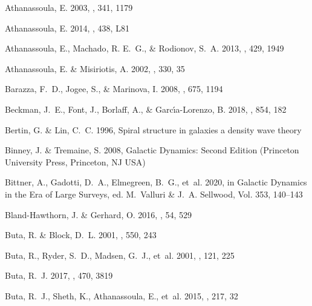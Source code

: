 \documentclass{aa}
\begin{document}
\begin{thebibliography}{100}
{Athanassoula}, E. 2003, \mnras, 341, 1179

{Athanassoula}, E. 2014, \mnras, 438, L81

{Athanassoula}, E., {Machado}, R. E.~G., \& {Rodionov}, S.~A. 2013, \mnras,
  429, 1949

{Athanassoula}, E. \& {Misiriotis}, A. 2002, \mnras, 330, 35

{Barazza}, F.~D., {Jogee}, S., \& {Marinova}, I. 2008, \apj, 675, 1194

{Beckman}, J.~E., {Font}, J., {Borlaff}, A., \& {Garc{\'\i}a-Lorenzo}, B. 2018,
  \apj, 854, 182

{Bertin}, G. \& {Lin}, C.~C. 1996, {Spiral structure in galaxies a density wave
  theory}

{Binney}, J. \& {Tremaine}, S. 2008, {Galactic Dynamics: Second Edition}
  (Princeton University Press, Princeton, NJ USA)

{Bittner}, A., {Gadotti}, D.~A., {Elmegreen}, B.~G., {et~al.} 2020, in Galactic
  Dynamics in the Era of Large Surveys, ed. M.~{Valluri} \& J.~A. {Sellwood},
  Vol. 353, 140--143

{Bland-Hawthorn}, J. \& {Gerhard}, O. 2016, \araa, 54, 529

{Buta}, R. \& {Block}, D.~L. 2001, \apj, 550, 243

{Buta}, R., {Ryder}, S.~D., {Madsen}, G.~J., {et~al.} 2001, \aj, 121, 225

{Buta}, R.~J. 2017, \mnras, 470, 3819

{Buta}, R.~J., {Sheth}, K., {Athanassoula}, E., {et~al.} 2015, \apjs, 217, 32


\end{thebibliography}
\end{document}
